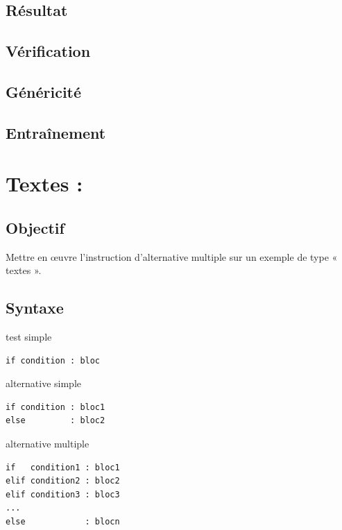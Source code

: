 \subsection{Résultat}\label{tests:jeux:resultat}

\subsection{Vérification}\label{tests:jeux:verification}

\subsection{Généricité}\label{tests:jeux:genericite}

\subsection{Entraînement}\label{tests:jeux:entrainement}


\section{Textes : }

\subsection{Objectif}\label{tests:textes:objectif}
Mettre en \oe uvre l'instruction d'alternative multiple sur un exemple de type « textes ».

\subsection{Syntaxe \python}\label{tests:textes:python}
\noindent\begin{minipage}[t]{0.3\textwidth}
test simple\footnotesize
\begin{Verbatim}
if condition : bloc
\end{Verbatim}
\end{minipage}
\hfill
\begin{minipage}[t]{0.3\textwidth}
alternative simple\footnotesize
\begin{Verbatim}
if condition : bloc1
else         : bloc2
\end{Verbatim}
\end{minipage}
\hfill
\begin{minipage}[t]{0.3\textwidth}
alternative multiple\footnotesize
\begin{Verbatim}
if   condition1 : bloc1
elif condition2 : bloc2
elif condition3 : bloc3
...
else            : blocn
\end{Verbatim}
\end{minipage}

